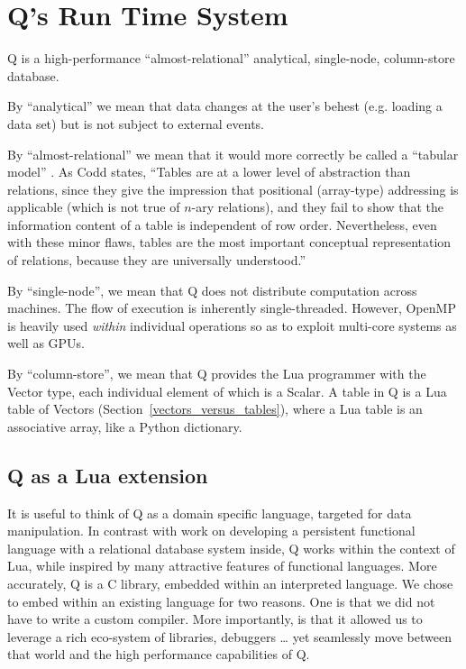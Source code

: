 \section{Q's Run Time System}

Q is a high-performance ``almost-relational'' 
analytical, single-node, column-store database. 
\be
\item 
By ``analytical'' we mean that data changes at the user's behest (e.g.
loading a data set) but is not subject to external events.
\item 
By ``almost-relational'' we mean that it would more correctly
be called a ``tabular model'' \cite{Codd1982}. As Codd states, ``Tables are
at a lower level of abstraction than relations, since they give
the impression that positional (array-type) addressing is applicable
(which is not true of \(n\)-ary relations), and they fail to
show that the information content of a table is independent
of row order. Nevertheless, even with these minor flaws,
tables are the most important conceptual representation of
relations, because they are universally understood.''
\item By ``single-node'', we mean that Q does not distribute computation across
  machines. The flow of execution is inherently single-threaded. However,
  OpenMP is heavily used {\em within} individual operations so as
  to exploit multi-core systems as well as GPUs.
\item By ``column-store'', we mean that 
Q provides the Lua programmer with the Vector type, each
individual element of which is a Scalar. A table in Q is a Lua
table of Vectors (Section~\ref{vectors_versus_tables}), where a Lua table is an
associative array, like a Python dictionary.

\ee

\subsection{Q as a Lua extension}


It is useful to think of Q as a domain specific language, targeted for data
manipulation. In contrast with \cite{Wevers2014} work on
developing a persistent functional language with
a relational database system inside, Q works within the context of Lua, while
inspired by many attractive features of functional languages.
More accurately, Q is a C library, embedded within an interpreted
language.
We chose to embed within an existing language for two reasons. One is that we did not have to
write a custom compiler. More importantly, is that it allowed us to leverage a rich eco-system of libraries, debuggers
\ldots
yet seamlessly move between that world and the high performance capabilities of
Q. 

